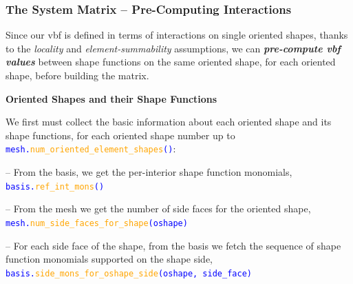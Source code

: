 \documentclass[compress]{beamer}
\begin{document}
\begin{frame}
  \frametitle{The System Matrix -- Pre-Computing Interactions}
  
  Since our vbf is defined in terms of interactions on single oriented shapes, thanks to the \emph{locality} and
  \emph{element-summability} assumptions, we can \emph{\textbf{pre-compute vbf values}} between shape functions on the same
  oriented shape, for each oriented shape, before building the matrix.
  
  \pause
  \vspace{.2cm}
  \textbf{Oriented Shapes and their Shape Functions}
 
  \vspace{.1cm}
  We first must collect the basic information about each oriented shape and its shape functions, for each oriented shape number up to
  \texttt{\small \textcolor{blue}{mesh.\textcolor{orange}{num\_oriented\_element\_shapes}()}}:
  \vspace{.15cm}

  \pause
  -- From the basis, we get the per-interior shape function monomials,\\ 
  \hspace{0.5cm}\texttt{\small \textcolor{blue}{basis.\textcolor{orange}{ref\_int\_mons}()}}
    
  \pause
  -- From the mesh we get the number of side faces for the oriented shape,\\ 
  \hspace{0.5cm}\texttt{\small \textcolor{blue}{mesh.\textcolor{orange}{num\_side\_faces\_for\_shape}(oshape)}}

  \pause
  -- For each side face of the shape, from the basis we fetch the sequence of shape function monomials supported on the shape side,\\
  \hspace{0.5cm}\texttt{\small \textcolor{blue}{basis.\textcolor{orange}{side\_mons\_for\_oshape\_side}(oshape, side\_face)}}
\end{frame}
\end{document}
